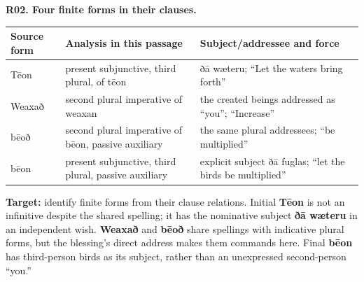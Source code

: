 \par\begin{minipage}{\linewidth}\raggedright
\textbf{R02. Four finite forms in their clauses.}

\par\begingroup
\fontsize{10.5}{13.2}\selectfont
\setlength{\LTleft}{0pt}\setlength{\LTright}{\fill}
\noindent
\begin{tabular}{@{}>{\raggedright\arraybackslash}p{15.78mm}>{\raggedright\arraybackslash}p{47.35mm}>{\raggedright\arraybackslash}p{55.24mm}@{}}
\toprule
\textbf{Source form} & \textbf{Analysis in this passage} & \textbf{Subject/\allowbreak{}addressee and force} \\
\midrule
Tēon & present subjunctive, third plural, of tēon & ðā wæteru; “Let the waters bring forth” \\
Weaxað & second plural imperative of weaxan & the created beings addressed as “you”; “Increase” \\
bēoð & second plural imperative of bēon, passive auxiliary & the same plural addressees; “be multiplied” \\
bēon & present subjunctive, third plural, passive auxiliary & explicit subject ðā fuglas; “let the birds be multiplied” \\
\bottomrule
\end{tabular}
\par\endgroup

\textbf{Target:} identify finite forms from their clause relations. Initial \textbf{Tēon} is not an infinitive despite the shared spelling; it has the nominative subject \textbf{ðā wæteru} in an independent wish. \textbf{Weaxað} and \textbf{bēoð} share spellings with indicative plural forms, but the blessing’s direct address makes them commands here. Final \textbf{bēon} has third-person birds as its subject, rather than an unexpressed second-person “you.”

\end{minipage}\par\addvspace{4pt}

